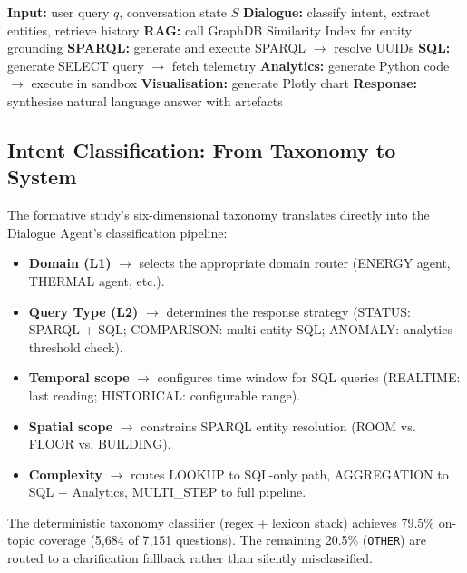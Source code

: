\documentclass[acmsmall]{acmart}
\begin{document}
\begin{algorithm}[t]
\caption{OntoSage Query Pipeline}
\label{alg:ontosage}
\begin{algorithmic}[1]
\State \textbf{Input:} user query $q$, conversation state $S$
\State \textbf{Dialogue:} classify intent, extract entities, retrieve history
\State \textbf{RAG:} call GraphDB Similarity Index for entity grounding
\State \textbf{SPARQL:} generate and execute SPARQL $\rightarrow$ resolve UUIDs
    \State \textbf{SQL:} generate SELECT query $\rightarrow$ fetch telemetry
        \State \textbf{Analytics:} generate Python code $\rightarrow$ execute in sandbox
    \EndIf
        \State \textbf{Visualisation:} generate Plotly chart
    \EndIf
\EndIf
\State \textbf{Response:} synthesise natural language answer with artefacts
\end{algorithmic}
\end{algorithm}

\subsection{Intent Classification: From Taxonomy to System}

The formative study's six-dimensional taxonomy translates directly into the Dialogue Agent's classification pipeline:

\begin{itemize}
    \item \textbf{Domain (L1)} $\rightarrow$ selects the appropriate domain router (ENERGY agent, THERMAL agent, etc.).
    \item \textbf{Query Type (L2)} $\rightarrow$ determines the response strategy (STATUS: SPARQL + SQL; COMPARISON: multi-entity SQL; ANOMALY: analytics threshold check).
    \item \textbf{Temporal scope} $\rightarrow$ configures time window for SQL queries (REALTIME: last reading; HISTORICAL: configurable range).
    \item \textbf{Spatial scope} $\rightarrow$ constrains SPARQL entity resolution (ROOM vs. FLOOR vs. BUILDING).
    \item \textbf{Complexity} $\rightarrow$ routes LOOKUP to SQL-only path, AGGREGATION to SQL + Analytics, MULTI\_STEP to full pipeline.
\end{itemize}

The deterministic taxonomy classifier (regex + lexicon stack) achieves 79.5\% on-topic coverage (5{,}684 of 7{,}151 questions). The remaining 20.5\% (\texttt{OTHER}) are routed to a clarification fallback rather than silently misclassified.
\end{document}
